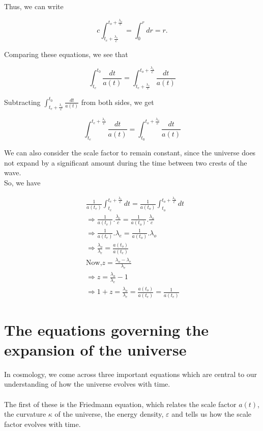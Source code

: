 \documentclass[a4,12pt,oneside]{report}
\begin{document}
	Thus, we can write
	
	\begin{equation}	
		c\int_{t_e+\frac{\lambda_e}{c}}^{t_o+\frac{\lambda_o}{c}}= \int_0^r dr = r.
	\end{equation}
	
	Comparing these equations, we see that
	
	\begin{equation}
		\int_{t_e}^{t_0} \frac{dt}{a(t)} = \int_{t_e+\frac{\lambda_e}{c}}^{t_o+\frac{\lambda_o}{c}} \frac{dt}{a(t)}
	\end{equation}
	
	Subtracting $ \int_{t_e+\frac{\lambda_e}{c}}^{t_0} \frac{dt}{a(t)} $ from both sides, we get
	
	\begin{equation}
		\int_{t_e}^{t_e+\frac{\lambda_e}{c}} \frac{dt}{a(t)} = \int_{t_0}^{t_o+\frac{\lambda_o}{c}} \frac{dt}{a(t)}
	\end{equation}
	
	We can also consider the scale factor to remain constant, since the universe does not expand by a significant amount during the time between two crests of the wave. \\
	
	So, we have
	
	\begin{align}
		&\frac{1}{a(t_e)}\int_{t_e}^{t_e+\frac{\lambda_e}{c}} dt = \frac{1}{a(t_o)}\int_{t_o}^{t_o+\frac{\lambda_o}{c}} dt	
		\\
		&\Rightarrow \frac{1}{a(t_e)}.\frac{\lambda_e}{c} =\frac{1}{a(t_o)}.\frac{\lambda_o}{c}
		\\
		&\Rightarrow \frac{1}{a(t_e)}.\lambda_e = \frac{1}{a(t_o)}.\lambda_o
		\\
		&\Rightarrow \frac{\lambda_o}{\lambda_e} = \frac{a(t_o)}{a(t_e)}
		\\
		&\text{Now,} z=\frac{\lambda_o-\lambda_e}{\lambda_e} \\
		&\Rightarrow z=\frac{\lambda_o}{\lambda_e}-1 \\
		&\Rightarrow 1+z = \frac{\lambda_o}{\lambda_e} = \frac{a(t_o)}{a(t_e)} = \frac{1}{a(t_e)}
	\end{align}
	
	
	\section{The equations governing the expansion of the universe}
	
	In cosmology, we come across three important equations which are central to our understanding of how the universe evolves with time.\\ \\
	The first of these is the Friedmann equation, which relates the scale factor $a(t)$, the curvature $\kappa$ of the universe, the energy density, $\varepsilon$ and tells us how the scale factor evolves with time.\\
	
\end{document}
